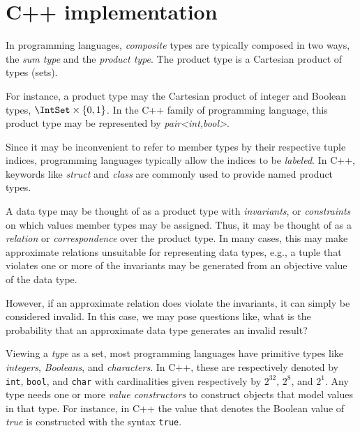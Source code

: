 \documentclass[ ../main.tex]{subfiles}
\begin{document}
\section{C++ implementation}



In programming languages, \emph{composite} types are typically composed in two ways, the \emph{sum type} and the \emph{product type}.
The product type is a Cartesian product of types (sets).

For instance, a product type may the Cartesian product of integer and Boolean types, $\IntSet \times \{0,1\}$. In the C++ family of programming language, this product type may be represented by \emph{pair<int,bool>}.

Since it may be inconvenient to refer to member types by their respective tuple indices, programming languages typically allow the indices to be \emph{labeled}. In C++, keywords like \emph{struct} and \emph{class} are commonly used to provide named product types.

A data type may be thought of as a product type with \emph{invariants}, or \emph{constraints} on which values member types may be assigned. Thus, it may be thought of as a \emph{relation} or \emph{correspondence} over the product type. In many cases, this may make approximate relations unsuitable for representing data types, e.g., a tuple that violates one or more of the invariants may be generated from an objective value of the data type.

However, if an approximate relation does violate the invariants, it can simply be considered invalid. In this case, we may pose questions like, what is the probability that an approximate data type generates an invalid result?

Viewing a \emph{type} as a set, most programming languages have primitive types like \emph{integers}, \emph{Booleans}, and \emph{characters}.
In C++, these are respectively denoted by \texttt{int}, \texttt{bool}, and \texttt{char} with cardinalities given respectively by $2^{32}$, $2^8$, and $2^1$.
Any type needs one or more \emph{value constructors} to construct objects that model values in that type.
For instance, in C++ the value that denotes the Boolean value of \emph{true} is constructed with the syntax \texttt{true}.
\end{document}
